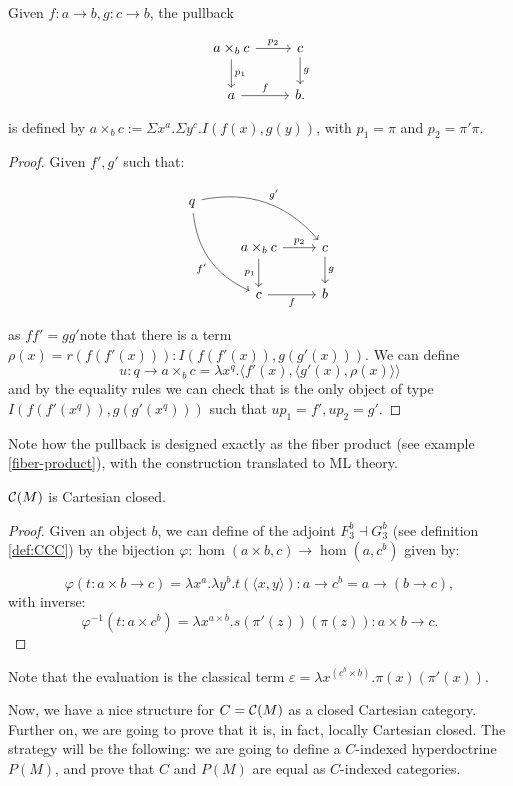 \begin{proposition}
  Given $f:a\to b, g:c\to b$, the pullback
  \[
    \begin{tikzpicture}
      \node {\begin{tikzcd}
          a\times_b c \ar[d,"p_1"]\ar[r,"p_2"] & c\ar[d,"g"]\\
          a\ar[r,"f"] &   b.
        \end{tikzcd}};
    \end{tikzpicture}
  \]
  is defined by $a\times_b c := \Sigma x^a. \Sigma y^c. I(f(x),g(y))$, with $p_1=\pi$ and $p_2=\pi'\pi$.
\end{proposition}
\begin{proof}
  Given $f',g'$ such that:

  
  \[
    \begin{tikzcd}
      q
      \arrow[bend left]{drr}{g'}
      \arrow[bend right,swap]{ddr}{f'} & & \\
      & a\times_{b}c \arrow{r}{p_2} \arrow{d}[swap]{p_1} & c \arrow{d}{g} \\
      & c \arrow[swap]{r}{f}   & b
    \end{tikzcd}
  \]

  as $ff' = gg'$note that there is a term $\rho(x) = r(f(f'(x))) : I(f(f'(x)), g(g'(x)))$. We can define $$u: q\to a\times_b c = \lambda x^q. \langle f'(x),\langle g'(x),\rho(x)\rangle\rangle$$
  and by the equality rules we can check that is the only object of type $I(f(f'(x^q)), g(g'(x^q)))$ such that $up_1 = f',up_2=g'$.
\end{proof}
\begin{remark}
  Note how the pullback is designed exactly as the fiber product (see example \ref{fiber-product}), with the construction translated to ML theory.
\end{remark}

\begin{proposition}\label{prop:CM2}
  $\mathcal{C}(M)$ is Cartesian closed.
\end{proposition}
\begin{proof}
  Given an object $b$, we can define of the adjoint $F_3^b\dashv G_3^b$ (see definition \ref{def:CCC}) by the bijection $\varphi: \hom(a\times b, c) \to \hom(a, c^b)$ given by:
  
  $$\varphi(t:a\times b\to c) = \lambda x^a.\lambda y^b. t(\langle x,y\rangle) : a\to c^b = a\to (b\to c),$$
  with inverse:
  $$\varphi^{-1}(t:a\times c^b) = \lambda x^{a\times b}. s(\pi'(z))(\pi(z)) : a\times b\to c.$$
\end{proof}
\begin{remark}
  Note that the evaluation is the classical term  $\varepsilon  = \lambda x^{(c^b\times b)}.\pi(x)(\pi'(x))$.
\end{remark}
Now, we have a nice structure for $C=\mathcal{C}(M)$ as a closed Cartesian category. Further on, we are going to prove that it is, in fact, locally Cartesian closed.  The strategy will be the following:  we are going to define a $C$-indexed hyperdoctrine $P(M)$, and prove that $C$ and $P(M)$ are equal as $C$-indexed categories.

